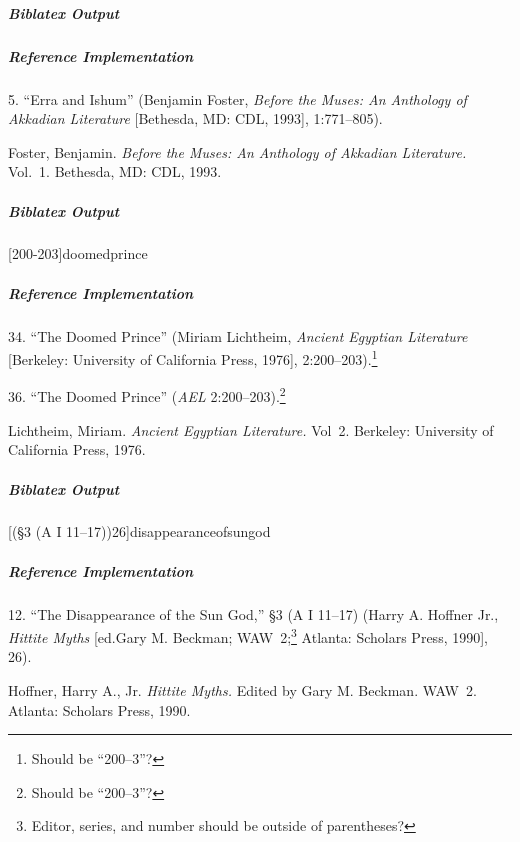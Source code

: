 \documentclass[a4paper]{article}
\newenvironment{biboutput}{%
  \subparagraph{Biblatex Output}
}{\color{black}}
\newenvironment{refimp}{%
  \subparagraph{Reference Implementation}
  \color{reference-colour}
  \rm
}{\par\color{black}}
\begin{document}
\begin{biboutput}
\end{biboutput}

\begin{refimp}
  \hspace*{\bibindent}5. “Erra and Ishum” (Benjamin Foster, \emph{Before the
  Muses: An Anthology of Akkadian Literature} [Bethesda, MD: CDL, 1993],
  1:771–805).
  
  \hangindent\bibindent Foster, Benjamin. \emph{Before the Muses: An Anthology of
  Akkadian Literature.} Vol.~1. Bethesda, MD: CDL, 1993.
\end{refimp}

\begin{biboutput}
  [200-203]{doomedprince}
\end{biboutput}

\begin{refimp}
  \hspace*{\bibindent}34. “The Doomed Prince” (Miriam Lichtheim, \emph{Ancient
  Egyptian Literature} [Berkeley: University of California Press, 1976],
  2:200–203).\footnote{Should be “200–3”?}
  
  \hspace*{\bibindent}36. “The Doomed Prince” (\emph{AEL}
  2:200–203).\footnote{Should be “200–3”?}
  
  \hangindent \bibindent Lichtheim, Miriam. \emph{Ancient Egyptian
  Literature.} Vol~2. Berkeley: University of California Press, 1976.

\end{refimp}

\begin{biboutput}
  [(§3 \mkbibparens{A I 11--17})26]{disappearanceofsungod}
\end{biboutput}

\begin{refimp}
  \hspace*{\bibindent}12. “The Disappearance of the Sun God,” §3 (A I 11–17)
  (Harry A. Hoffner Jr., \emph{Hittite Myths} [ed.\@ Gary M. Beckman;
  WAW~2;\footnote{Editor, series, and number should be outside of
  parentheses?} Atlanta: Scholars Press, 1990], 26).
  
  \hangindent\bibindent Hoffner, Harry A., Jr. \emph{Hittite Myths.} Edited by
  Gary M. Beckman. WAW~2. Atlanta: Scholars Press, 1990.

\end{refimp}
\end{document}
